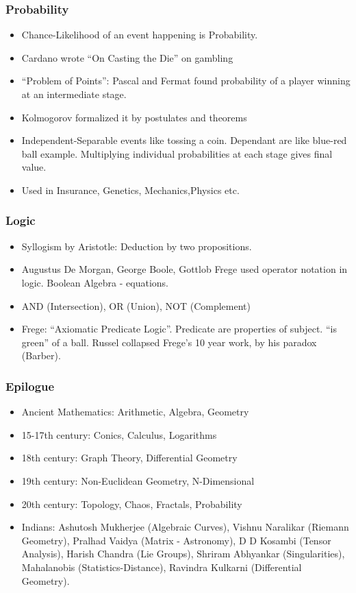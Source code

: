 \begin{frame}[fragile]
\frametitle{Probability}
\begin{itemize}
\item Chance-Likelihood of an event happening is Probability.
\item Cardano wrote ``On Casting the Die'' on gambling
\item ``Problem of Points'': Pascal and Fermat found probability of a player winning at an intermediate stage.
\item Kolmogorov formalized it by postulates and theorems
\item Independent-Separable events like tossing a coin. Dependant are like blue-red ball example. Multiplying individual probabilities at each stage gives final value.
\item Used in Insurance, Genetics, Mechanics,Physics etc.
\end{itemize}
\end{frame}

\begin{frame}[fragile]
\frametitle{Logic}
\begin{itemize}
\item Syllogism by Aristotle: Deduction by two propositions.
\item Augustus De Morgan, George Boole, Gottlob Frege used operator notation in logic. Boolean Algebra - equations.
\item AND (Intersection), OR (Union), NOT (Complement)
\item Frege: ``Axiomatic Predicate Logic''. Predicate are properties of subject. ``is green'' of a ball. Russel collapsed Frege's 10 year work, by his paradox (Barber).
\end{itemize}
\end{frame}

\begin{frame}[fragile]
\frametitle{Epilogue}

\begin{itemize}
\item Ancient Mathematics: Arithmetic, Algebra, Geometry
\item 15-17th century: Conics, Calculus, Logarithms
\item 18th century: Graph Theory, Differential Geometry
\item 19th century: Non-Euclidean Geometry, N-Dimensional
\item 20th century: Topology, Chaos, Fractals, Probability
\item Indians: Ashutosh Mukherjee (Algebraic Curves), Vishnu Naralikar (Riemann Geometry), Pralhad Vaidya (Matrix - Astronomy), D D Kosambi (Tensor Analysis), Harish Chandra (Lie Groups), Shriram Abhyankar (Singularities), Mahalanobis  (Statistics-Distance), Ravindra Kulkarni (Differential Geometry).
\end{itemize}
\end{frame}



